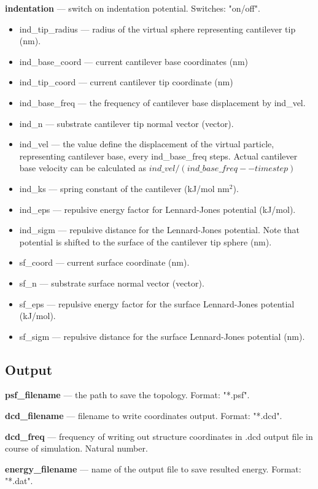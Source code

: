 \documentclass[12pt,a4paper]{article}
\begin{document}
{\bf indentation} --- switch on indentation potential. Switches: "on/off".
\begin{itemize}
\item ind\_tip\_radius --- radius of the virtual sphere representing cantilever tip (nm).
\item ind\_base\_coord --- current cantilever base coordinates (nm)
\item ind\_tip\_coord --- current cantilever tip coordinate (nm)
\item ind\_base\_freq --- the frequency of cantilever base displacement by ind\_vel.
\item ind\_n --- substrate cantilever tip normal vector (vector).
\item ind\_vel --- the value define the displacement of the virtual particle, representing cantilever base, every ind\_base\_freq steps. Actual cantilever base velocity can be calculated as $ind\_vel/(ind\_base\_freq -- timestep)$
\item ind\_ks --- spring constant of the cantilever (kJ/mol nm$^2$).
\item ind\_eps --- repulsive energy factor for Lennard-Jones potential (kJ/mol).
\item ind\_sigm --- repulsive distance for the Lennard-Jones potential. Note that potential is shifted to the surface of the cantilever tip sphere (nm).
\item sf\_coord --- current surface coordinate (nm).
\item sf\_n --- substrate surface normal vector (vector).
\item sf\_eps ---  repulsive energy factor for the surface Lennard-Jones potential (kJ/mol). 
\item sf\_sigm --- repulsive distance for the surface Lennard-Jones potential (nm).
\end{itemize}

\subsection{Output}

{\bf psf\_filename} --- the path to save the topology. Format: "*.psf".

{\bf dcd\_filename} --- filename to write coordinates output. Format: "*.dcd".

{\bf dcd\_freq} --- frequency of writing out structure coordinates in .dcd output file in course of simulation. Natural number.

{\bf energy\_filename} --- name of the output file to save resulted energy. Format: "*.dat".
\end{document}
